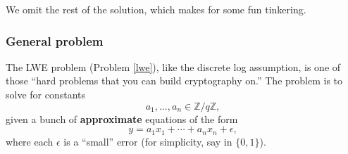 We omit the rest of the solution, which makes for some fun tinkering.

\subsubsection{General problem}

The LWE problem (Problem \ref{lwe}), like the discrete log
assumption, is one of those ``hard problems that you can build
cryptography on.'' The problem is to solve for constants
\[a_{1},\ldots,a_{n} \in {\mathbb{Z}}/q{\mathbb{Z}},\] given a bunch of
\textbf{approximate} equations of the form
\[y = a_{1}x_{1} + \cdots + a_{n}x_{n} + \epsilon,\] where each
\(\epsilon\) is a ``small'' error (for simplicity, say in \(\{ 0,1\}\)).
